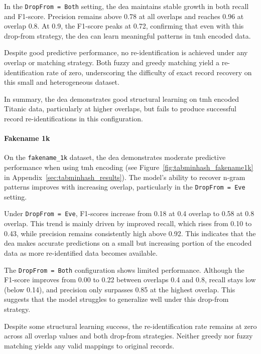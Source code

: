 In the \texttt{DropFrom = Both} setting, the \ac{dea} maintains stable growth in both recall and F1-score.
Precision remains above 0.78 at all overlaps and reaches 0.96 at overlap 0.8.
At 0.9, the F1-score peaks at 0.72, confirming that even with this drop-from strategy, the \ac{dea} can learn meaningful patterns in \ac{tmh} encoded data.

Despite good predictive performance, no re-identification is achieved under any overlap or matching strategy.
Both fuzzy and greedy matching yield a re-identification rate of zero, underscoring the difficulty of exact record recovery on this small and heterogeneous dataset.



In summary, the \ac{dea} demonstrates good structural learning on \ac{tmh} encoded Titanic data, particularly at higher overlaps, but fails to produce successful record re-identifications in this configuration.


\paragraph{Fakename 1k}

On the \texttt{fakename\_1k} dataset, the \ac{dea} demonstrates moderate predictive performance when using \ac{tmh} encoding (see Figure~\ref{fig:tabminhash_fakename1k} in Appendix~\ref{sec:tabminhash_results}).
The model's ability to recover n-gram patterns improves with increasing overlap, particularly in the \texttt{DropFrom = Eve} setting.

Under \texttt{DropFrom = Eve}, F1-scores increase from 0.18 at 0.4 overlap to 0.58 at 0.8 overlap.
This trend is mainly driven by improved recall, which rises from 0.10 to 0.43, while precision remains consistently high above 0.92.
This indicates that the \ac{dea} makes accurate predictions on a small but increasing portion of the encoded data as more re-identified data becomes available.

The \texttt{DropFrom = Both} configuration shows limited performance.
Although the F1-score improves from 0.00 to 0.22 between overlaps 0.4 and 0.8, recall stays low (below 0.14), and precision only surpasses 0.85 at the highest overlap.
This suggests that the model struggles to generalize well under this drop-from strategy.

Despite some structural learning success, the re-identification rate remains at zero across all overlap values and both drop-from strategies.
Neither greedy nor fuzzy matching yields any valid mappings to original records.



